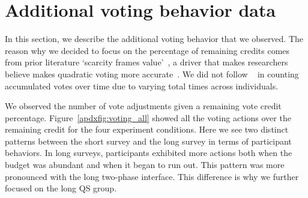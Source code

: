 \section{Additional voting behavior data}
\label{apdx:additional_results_behavior}
In this section, we describe the additional voting behavior that we observed. The reason why we decided to focus on the percentage of remaining credits comes from prior literature `scarcity frames value'~\cite{Shah2015a}, a driver that makes researchers believe makes quadratic voting more accurate~\cite{chengCanShowWhat2021}. We did not follow ~\textcite{quarfoot2017quadratic} in counting accumulated votes over time due to varying total times across individuals.

We observed the number of vote adjustments given a remaining vote credit percentage. Figure~\ref{apdxfig:voting_all} showed all the voting actions over the remaining credit for the four experiment conditions. Here we see two distinct patterns between the short survey and the long survey in terms of participant behaviors. In long surveys, participants exhibited more actions both when the budget was abundant and when it began to run out. This pattern was more pronounced with the long two-phase interface. This difference is why we further focused on the long QS group.

